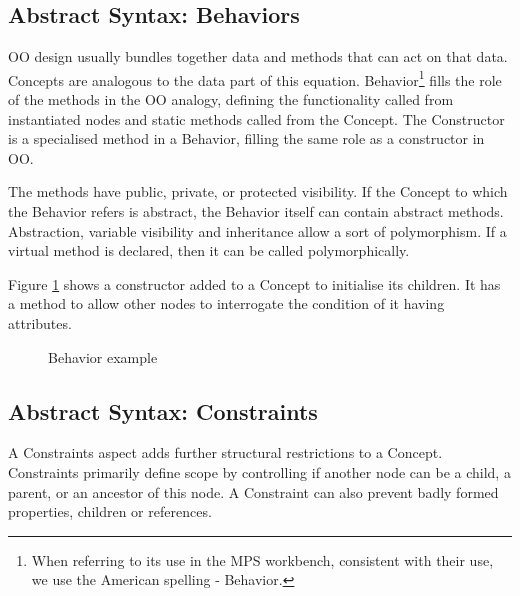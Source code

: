 \subsection{Abstract Syntax: Behaviors}
OO design usually bundles together data and methods that can act on that data.
Concepts are analogous to the data part of this equation.
Behavior\footnote{When referring to its use in the MPS workbench, consistent with their use, we use the American spelling - Behavior.}
fills the role of the methods in the OO analogy, defining the functionality called from instantiated nodes and static methods called from the Concept.
The Constructor is a specialised method in a Behavior, filling the same role as a constructor in OO.

The methods have public, private, or protected visibility.
If the Concept to which the Behavior refers is abstract, the Behavior itself can contain abstract methods.
Abstraction, variable visibility and inheritance allow a sort of polymorphism.
If a virtual method is declared, then it can be called polymorphically.

Figure \ref{fig:behavior_example} shows a constructor added to a Concept to initialise its children.
It has a method to allow other nodes to interrogate the condition of it having attributes.

\begin{figure}[h]
    \centering
    \caption{Behavior example}
    \label{fig:behavior_example}
\end{figure}
 
\subsection{Abstract Syntax: Constraints}
A Constraints aspect adds further structural restrictions to a Concept.
Constraints primarily define scope by controlling if another node can be a child, a parent, or an ancestor of this node.
A Constraint can also prevent badly formed properties, children or references.

